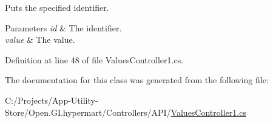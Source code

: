 Puts the specified identifier. 


\begin{DoxyParams}{Parameters}
{\em id} & The identifier.\\
\hline
{\em value} & The value.\\
\hline
\end{DoxyParams}


Definition at line 48 of file Values\+Controller1.\+cs.



The documentation for this class was generated from the following file\+:\begin{DoxyCompactItemize}
\item 
C\+:/\+Projects/\+App-\/\+Utility-\/\+Store/\+Open.\+G\+I.\+hypermart/\+Controllers/\+A\+P\+I/\hyperlink{_values_controller1_8cs}{Values\+Controller1.\+cs}\end{DoxyCompactItemize}
